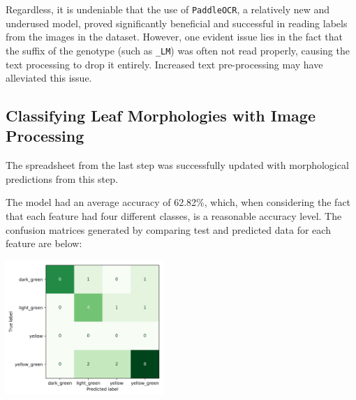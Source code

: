 \documentclass[final,5p,times,twocolumn,authoryear]{elsarticle}
\begin{document}
Regardless, it is undeniable that the use of \verb|PaddleOCR|, a relatively new and underused model, proved significantly beneficial and successful in reading labels from the images in the dataset. However, one evident issue lies in the fact that the suffix of the genotype (such as \verb|_LM|) was often not read properly, causing the text processing to drop it entirely. Increased text pre-processing may have alleviated this issue.

\subsection{Classifying Leaf Morphologies with Image Processing}
\label{step_2}

The spreadsheet from the last step was successfully updated with morphological predictions from this step.

\begin{center}
\label{Table1}
\end{center}

The model had an average accuracy of 62.82\%, which, when considering the fact that each feature had four different classes, is a reasonable accuracy level. The confusion matrices generated by comparing test and predicted data for each feature are below:

\begin{center}
    \includegraphics[width=0.45\textwidth]{images/morph_conf_matrix/color.png}
\end{center}
\end{document}
